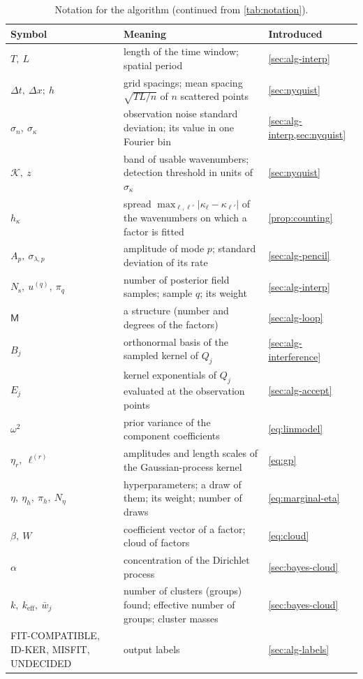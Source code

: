 \documentclass[11pt]{article}
\theoremstyle{plain}
\theoremstyle{definition}
\theoremstyle{remark}
\newcommand{\noise}{\sigma_{n}}             %
\newcommand{\sigbin}{\sigma_{\kappa}}       %
\newcommand{\Nsamp}{N_{\mathrm s}}          %
\newcommand{\keff}{k_{\mathrm{eff}}}        %
\newcommand{\cloud}{W}                      %
\newcommand{\Mfit}{\mathsf{M}}              %
\newcommand{\lab}[1]{\textsf{#1}}           %
\newcommand{\FC}{\lab{FIT-COMPATIBLE}}
\newcommand{\IDK}{\lab{ID-KER}}
\newcommand{\MIS}{\lab{MISFIT}}
\newcommand{\UND}{\lab{UNDECIDED}}
\newcommand{\abs}[1]{\lvert#1\rvert}
\begin{document}
\begin{table}[htbp]
\centering\small
\caption{Notation for the algorithm (continued from \cref{tab:notation}).}\label{tab:notation-alg}
\begin{tabularx}{\linewidth}{@{}l X l@{}}
\toprule
Symbol & Meaning & Introduced\\
\midrule
$T,\ L$ & length of the time window; spatial period & \cref{sec:alg-interp}\\
$\Delta t,\ \Delta x;\ h$ & grid spacings; mean spacing $\sqrt{TL/n}$ of $n$ scattered points & \cref{sec:nyquist}\\
$\noise,\ \sigbin$ & observation noise standard deviation; its value in one Fourier bin & \cref{sec:alg-interp,sec:nyquist}\\
$\mathcal K,\ z$ & band of usable wavenumbers; detection threshold in units of $\sigbin$ & \cref{sec:nyquist}\\
$h_\kappa$ & spread $\max_{\ell,\ell'}\abs{\kappa_\ell-\kappa_{\ell'}}$ of the wavenumbers on which a factor is fitted & \cref{prop:counting}\\
$A_p,\ \sigma_{\lambda,p}$ & amplitude of mode $p$; standard deviation of its rate & \cref{sec:alg-pencil}\\
$\Nsamp,\ u^{(q)},\ \pi_q$ & number of posterior field samples; sample $q$; its weight & \cref{sec:alg-interp}\\
$\Mfit$ & a structure (number and degrees of the factors) & \cref{sec:alg-loop}\\
$B_j$ & orthonormal basis of the sampled kernel of $Q_j$ & \cref{sec:alg-interference}\\
$E_j$ & kernel exponentials of $Q_j$ evaluated at the observation points & \cref{sec:alg-accept}\\
$\omega^2$ & prior variance of the component coefficients & \eqref{eq:linmodel}\\
$\eta_r,\ \ell^{(r)}$ & amplitudes and length scales of the Gaussian-process kernel & \eqref{eq:gp}\\
$\eta,\ \eta_h,\ \pi_h,\ N_\eta$ & hyperparameters; a draw of them; its weight; number of draws & \eqref{eq:marginal-eta}\\
$\beta,\ \cloud$ & coefficient vector of a factor; cloud of factors & \eqref{eq:cloud}\\
$\alpha$ & concentration of the Dirichlet process & \cref{sec:bayes-cloud}\\
$k,\ \keff,\ \bar w_j$ & number of clusters (groups) found; effective number of groups; cluster masses & \cref{sec:bayes-cloud}\\
\FC, \IDK, \MIS, \UND & output labels & \cref{sec:alg-labels}\\
\bottomrule
\end{tabularx}
\end{table}
\end{document}
